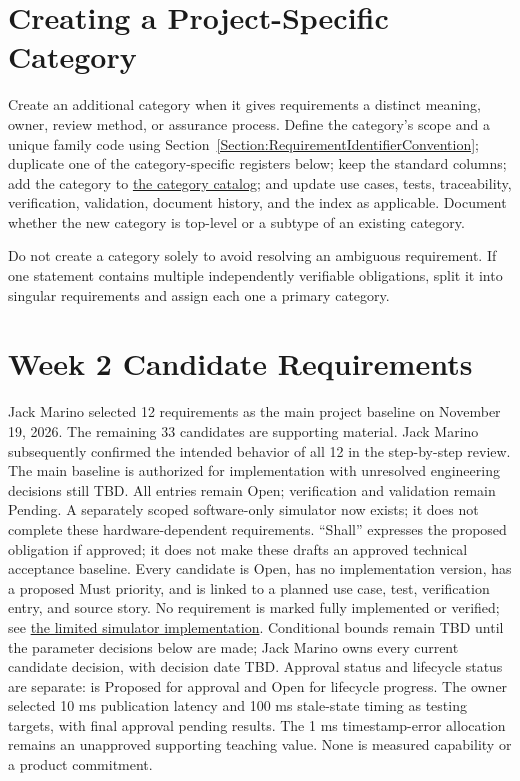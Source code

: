 \section{Creating a Project-Specific Category}
Create an additional category when it gives requirements a distinct meaning,
owner, review method, or assurance process. Define the category's scope and a
unique family code using
Section~\ref{Section:RequirementIdentifierConvention}; duplicate one of the
category-specific registers below; keep the standard columns; add the category to
\hyperref[Table:RequirementCategoryCatalog]{the category catalog}; and update
use cases, tests, traceability, verification, validation, document history, and
the index as applicable. Document whether the new category is top-level or a
subtype of an existing category.

Do not create a category solely to avoid resolving an ambiguous requirement.
If one statement contains multiple independently verifiable obligations, split
it into singular requirements and assign each one a primary category.

\section{Week 2 Candidate Requirements}
\label{Section:WeekTwoCandidates}
Jack Marino selected 12 requirements as the main project baseline on November 19, 2026. The remaining 33 candidates are supporting material. Jack Marino subsequently confirmed the intended behavior of all 12 in the step-by-step review. The main baseline is authorized for implementation with unresolved engineering decisions still TBD. All entries remain Open; verification and validation remain Pending. A separately scoped software-only simulator now exists; it does not complete these hardware-dependent requirements. ``Shall''
expresses the proposed obligation if approved; it does not make these drafts
an approved technical acceptance baseline. Every candidate is Open, has no implementation version,
has a proposed Must priority, and is linked to a planned use case, test,
verification entry, and source story. No requirement is marked fully implemented or verified; see \hyperref[Section:SimulatorPrototype]{the limited simulator implementation}.
Conditional bounds remain TBD until the parameter decisions below are made; Jack Marino owns every current candidate decision, with decision date TBD. Approval status and lifecycle status are separate:  is Proposed for approval and Open for lifecycle progress.
The owner selected 10 ms publication latency and 100 ms stale-state timing as testing targets, with final approval pending results. The 1 ms timestamp-error allocation remains an unapproved supporting teaching value. None is measured capability or a product commitment.

